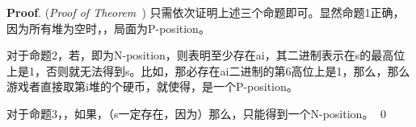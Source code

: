 \documentclass{article}
\begin{document}
\begin{mdbmarginx}{1ex}{0pt}{1ex}{0pt}%
\noindent{}\textbf{Proof}. ({\itshape Proof of Theorem~}) 只需依次证明上述三个命题即可。显然命题1正确，因为所有堆为空时，，局面为P-position。%

对于命题2，若，即为N-position，则表明至少存在ai，其二进制表示在s的最高位上是1，否则就无法得到s。比如，那必存在ai二进制的第6高位上是1，那么，那么游戏者直接取第i堆的个硬币，就使得，是一个P-position。%

对于命题3，，如果，（s一定存在，因为）那么，只能得到一个N-position。 \qed{}%
\end{mdbmarginx}%
\end{document}
